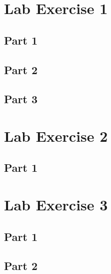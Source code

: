 \begin{appendices}
	\section{Lab Exercise 1}
	{
		\subsection{Part 1}
			{
				
			}
		\subsection{Part 2}
			{
				
			}
		\subsection{Part 3}
			{
				
			}
	}
	\section{Lab Exercise 2}
	{
		\subsection{Part 1}
			{
				
			}
	}
	\section{Lab Exercise 3}
	{
		\subsection{Part 1}
			{
				
			}
		\subsection{Part 2}
			{
				
			}
	}

\end{appendices}